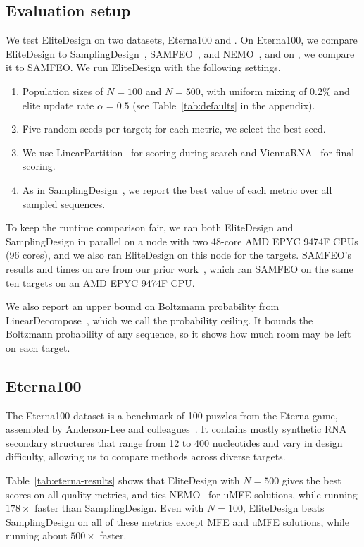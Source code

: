 \subsection{Evaluation setup}\label{sec:setup}
We test EliteDesign on two datasets, Eterna100 and \sixteenS{}. On Eterna100, we compare EliteDesign to SamplingDesign~\citep{tang2026}, SAMFEO~\citep{zhou2023}, and NEMO~\citep{portela2018}, and on \sixteenS{}, we compare it to SAMFEO.
We run EliteDesign with the following settings.
\begin{enumerate}
\item Population sizes of $N=100$ and $N=500$, with uniform
  mixing of 0.2\% and elite update rate $\alpha=0.5$ (see Table~\ref{tab:defaults} in the appendix).
\item Five random seeds per target;
  for each metric, we select the best seed.
\item We use LinearPartition~\citep{zhang2020} for scoring during search
  and ViennaRNA~\citep{lorenz2011} for final scoring.
\item As in SamplingDesign~\citep{tang2026}, we report the best value of each metric over all sampled sequences.
\end{enumerate}
To keep the runtime comparison fair, we ran both EliteDesign and SamplingDesign in parallel on a node with two 48-core AMD EPYC 9474F CPUs (96 cores), and we also ran EliteDesign on this node for the \sixteenS{} targets. SAMFEO's results and times on \sixteenS{} are from our prior work~\citep{zhou2026fastdesign}, which ran SAMFEO on the same ten targets on an AMD EPYC 9474F CPU.

We also report an upper bound on Boltzmann probability from LinearDecompose~\citep{zhou2026}, which we call the probability ceiling. It bounds the Boltzmann probability of any sequence, so it shows how much room may be left on each target.

\subsection{Eterna100}\label{sec:results-eterna}
The Eterna100 dataset is a benchmark of 100 puzzles
from the Eterna game, assembled by Anderson-Lee and
colleagues~\citep{andersonlee2016}. It contains mostly synthetic RNA secondary
structures that range from 12 to 400 nucleotides and vary in
design difficulty, allowing us to compare methods across diverse targets.

Table~\ref{tab:eterna-results} shows that EliteDesign with $N=500$ gives the best scores on all quality metrics, and ties NEMO~\citep{portela2018} for uMFE solutions, while running $178\times$ faster than SamplingDesign. Even with $N=100$, EliteDesign beats SamplingDesign on all of these metrics except MFE and uMFE solutions, while running about $500\times$ faster.

